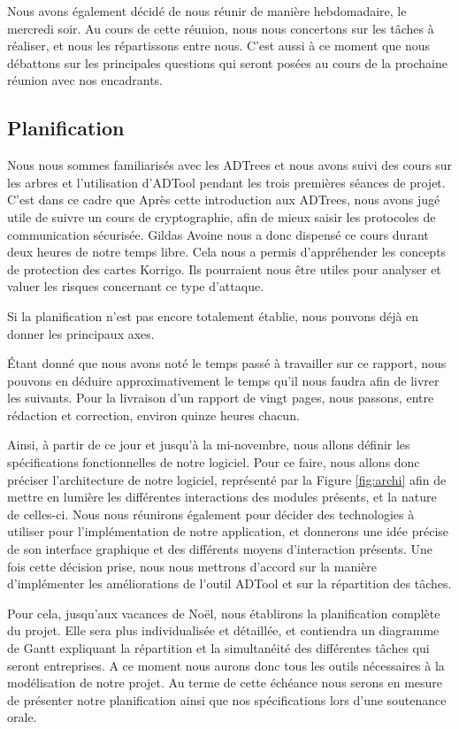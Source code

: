 	    Nous avons également décidé de nous réunir de manière hebdomadaire, le mercredi soir. Au cours de cette réunion, nous nous concertons sur les tâches à réaliser, et nous les répartissons entre nous. C'est aussi à ce moment que nous débattons sur les principales questions qui seront posées au cours de la prochaine réunion avec nos encadrants.

	    
	\subsection{Planification}
		Nous nous sommes familiarisés avec les ADTrees et nous avons suivi des cours sur les arbres et l'utilisation d'ADTool pendant les trois premières séances de projet. C'est dans ce cadre que 	    
	    Après cette introduction aux ADTrees, nous avons jugé utile de suivre un cours de cryptographie, afin de mieux saisir les protocoles de communication sécurisée. Gildas Avoine nous a donc dispensé ce cours durant deux heures de notre temps libre. Cela nous a permis d'appréhender les concepts de protection des cartes Korrigo. Ils pourraient nous être utiles pour analyser et valuer les risques concernant ce type d'attaque.
			
		Si la planification n'est pas encore totalement établie, nous pouvons déjà en donner les principaux axes.

		Étant donné que nous avons noté le temps passé à travailler sur ce rapport, nous pouvons en déduire approximativement le temps qu'il nous faudra afin de livrer les suivants. Pour la livraison d'un rapport de vingt pages, nous passons, entre rédaction et correction, environ quinze heures chacun.

		Ainsi, à partir de ce jour et jusqu'à la mi-novembre, nous allons définir les spécifications fonctionnelles de notre logiciel.
		Pour ce faire, nous allons donc préciser l'architecture de notre logiciel, représenté par la Figure \ref{fig:archi} afin de mettre en lumière les différentes interactions des modules présents, et la nature de celles-ci. Nous nous réunirons également pour décider des technologies à utiliser pour l'implémentation de notre application, et donnerons une idée précise de son interface graphique et des différents moyens d'interaction présents.
		Une fois cette décision prise, nous nous mettrons d'accord sur la manière d'implémenter les améliorations de l'outil ADTool et sur la répartition des tâches.

		Pour cela, jusqu'aux vacances de Noël, nous établirons la planification complète du projet. Elle sera plus individualisée et détaillée, et contiendra un diagramme de Gantt expliquant la répartition et la simultanéité des différentes tâches qui seront entreprises.
		A ce moment nous aurons donc tous les outils nécessaires à la modélisation de notre projet.
		Au terme de cette échéance nous serons en mesure de présenter notre planification ainsi que nos spécifications lors d'une soutenance orale.

